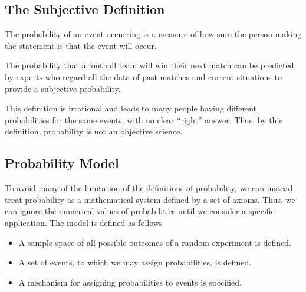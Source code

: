 \subsection*{The Subjective Definition}
The probability of an event occurring is a measure of how sure the person making the statement is that the event will occur.
\begin{example}
The probability that a football team will win their next match can be predicted by experts who regard all the data of past matches and current situations to provide a subjective probability.
\end{example}
\begin{info}
This definition is irrational and leads to many people having different probabilities for the same events, with no clear ``right'' answer. Thus, by this definition, probability is not an objective science.
\end{info}

\subsection*{Probability Model}
To avoid many of the limitation of the definitions of probability, we can instead treat probability as a mathematical system defined by a set of axioms. Thus, we can ignore the numerical values of probabilities until we consider a specific application. The model is defined as follows
\begin{itemize}
    \item A sample space of all possible outcomes of a random experiment is defined.
    \item A set of events, to which we may assign probabilities, is defined.
    \item A mechanism for assigning probabilities to events is specified.
\end{itemize}